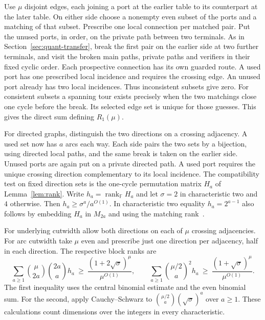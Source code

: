 \documentclass[11pt]{article}
\theoremstyle{definition}
\newcommand{\F}{\mathbb F}
\newcommand{\rank}{\operatorname{rank}}
\begin{document}
Use \(\mu\) disjoint edges, each joining a port at the earlier table to its counterpart at the later table. On either side choose a nonempty even subset of the ports and a matching of that subset. Prescribe one local connection per matched pair. Put the unused ports, in order, on the private path between two terminals. As in Section~\ref{sec:quant-transfer}, break the first pair on the earlier side at two further terminals, and visit the broken main paths, private paths and verifiers in their fixed cyclic order. Each prospective connection has its own guarded route. A used port has one prescribed local incidence and requires the crossing edge. An unused port already has two local incidences. Thus inconsistent subsets give zero. For consistent subsets a spanning tour exists precisely when the two matchings close one cycle before the break. Its selected edge set is unique for those guesses. This gives the direct sum defining \(R_1(\mu)\).

For directed graphs, distinguish the two directions on a crossing adjacency. A used set now has \(a\) arcs each way. Each side pairs the two sets by a bijection, using directed local paths, and the same break is taken on the earlier side. Unused ports are again put on a private directed path. A used port requires the unique crossing direction complementary to its local incidence. The compatibility test on fixed direction sets is the one-cycle permutation matrix \(H_a\) of Lemma~\ref{lem:rank}. Write \(h_a=\rank_\F H_a\) and let \(\sigma=2\) in characteristic two and \(4\) otherwise. Then \(h_a\ge\sigma^a/a^{O(1)}\). In characteristic two equality \(h_a=2^{a-1}\) also follows by embedding \(H_a\) in \(M_{2a}\) and using the matching rank~\cite{ckn}.

For underlying cutwidth allow both directions on each of \(\mu\) crossing adjacencies. For arc cutwidth take \(\mu\) even and prescribe just one direction per adjacency, half in each direction. The respective block ranks are
\[
 \sum_{a\ge1}\binom \mu{2a}\binom{2a}a h_a
       \ \ge\ \frac{(1+2\sqrt{\sigma})^\mu}{\mu^{O(1)}},\qquad
 \sum_{a\ge1}\binom{\mu/2}a^2 h_a
       \ \ge\ \frac{(1+\sqrt{\sigma})^\mu}{\mu^{O(1)}} .
\]
The first inequality uses the central binomial estimate and the even binomial sum. For the second, apply Cauchy--Schwarz to \(\binom{\mu/2}a(\sqrt{\sigma})^a\) over \(a\ge1\). These calculations count dimensions over the integers in every characteristic.
\end{document}
